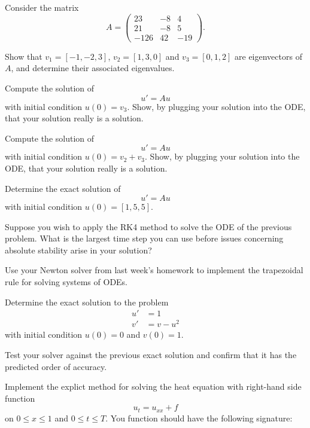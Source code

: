 \documentclass[minion]{homework}
\begin{document}
\begin{problems}

\problem Consider the matrix
\[
A = \begin{pmatrix} 
23 & -8 & 4\\
21 & -8 & 5\\
-126 & 42 & -19\end{pmatrix}.
\]
\begin{subproblems}
\item Show that $v_1=[-1,-2, 3]$,  $v_2=[1, 3 , 0]$ and 
$v_3=[0,1,2]$ are eigenvectors of $A$, and determine their
associated eigenvalues.
\item Compute the solution of
\[
u'=Au
\]
with initial condition $u(0)=v_3$.  Show, by plugging your solution
into the ODE, that your solution really is a solution.
\item Compute the solution of
\[
u'=Au
\]
with initial condition $u(0)=v_2+v_3$.  Show, by plugging your solution
into the ODE, that your solution really is a solution.
\item Determine the exact solution of
\[
u'=Au
\]
with initial condition $u(0) = [1,5,5]$.
\end{subproblems}

\problem Suppose you wish to apply the RK4 method to solve the ODE
of the previous problem.  What is the largest time step you can use before 
issues concerning absolute stability arise in your solution?

\problem
\begin{subproblems} 
\item Use your Newton solver from last week's homework to implement
the trapezoidal rule for solving systems of ODEs.  
\item Determine the exact solution to the problem
\begin{equation}
\begin{aligned}
u' &= 1\\
v' &= v - u^2
\end{aligned}
\end{equation}
with initial condition $u(0)=0$ and $v(0)=1$.
\item Test your solver against the previous exact solution
and confirm that it has the predicted order of accuracy.
\end{subproblems}

\problem Implement the explict method for solving the heat equation with
right-hand side function
\[
u_t=u_{xx} + f
\]
on $0\le x \le 1$ and $0\le t\le T$.  You function should have
the following signature:


\end{problems}
\end{document}
